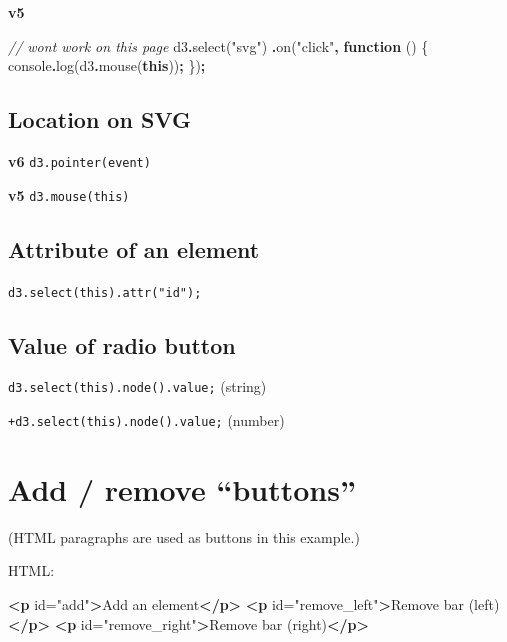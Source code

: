 \documentclass[
  openany]{book}
\newenvironment{Shaded}{\begin{snugshade}}{\end{snugshade}}
\newcommand{\BuiltInTok}[1]{#1}
\newcommand{\CommentTok}[1]{\textcolor[rgb]{0.56,0.35,0.01}{\textit{#1}}}
\newcommand{\FunctionTok}[1]{\textcolor[rgb]{0.00,0.00,0.00}{#1}}
\newcommand{\KeywordTok}[1]{\textcolor[rgb]{0.13,0.29,0.53}{\textbf{#1}}}
\newcommand{\NormalTok}[1]{#1}
\newcommand{\OperatorTok}[1]{\textcolor[rgb]{0.81,0.36,0.00}{\textbf{#1}}}
\newcommand{\OtherTok}[1]{\textcolor[rgb]{0.56,0.35,0.01}{#1}}
\newcommand{\StringTok}[1]{\textcolor[rgb]{0.31,0.60,0.02}{#1}}
\begin{document}
\textbf{v5}

\begin{Shaded}
\begin{Highlighting}[]
\CommentTok{// won\textquotesingle{}t work on this page}
\NormalTok{d3}\OperatorTok{.}\FunctionTok{select}\NormalTok{(}\StringTok{"svg"}\NormalTok{)}
  \OperatorTok{.}\FunctionTok{on}\NormalTok{(}\StringTok{"click"}\OperatorTok{,} \KeywordTok{function}\NormalTok{ () \{}
    \BuiltInTok{console}\OperatorTok{.}\FunctionTok{log}\NormalTok{(d3}\OperatorTok{.}\FunctionTok{mouse}\NormalTok{(}\KeywordTok{this}\NormalTok{))}\OperatorTok{;}
\NormalTok{    \})}\OperatorTok{;}
\end{Highlighting}
\end{Shaded}

\hypertarget{location-on-svg}{%
\subsection{Location on SVG}\label{location-on-svg}}

\textbf{v6}
\texttt{d3.pointer(event)}

\textbf{v5}
\texttt{d3.mouse(this)}

\hypertarget{attribute-of-an-element}{%
\subsection{Attribute of an element}\label{attribute-of-an-element}}

\texttt{d3.select(this).attr("id");}

\hypertarget{value-of-radio-button}{%
\subsection{Value of radio button}\label{value-of-radio-button}}

\texttt{d3.select(this).node().value;} (string)

\texttt{+d3.select(this).node().value;} (number)

\hypertarget{add-remove-buttons}{%
\section{Add / remove ``buttons''}\label{add-remove-buttons}}

(HTML paragraphs are used as buttons in this example.)

HTML:

\begin{Shaded}
\begin{Highlighting}[]
\KeywordTok{\textless{}p}\OtherTok{ id=}\StringTok{"add"}\KeywordTok{\textgreater{}}\NormalTok{Add an element}\KeywordTok{\textless{}/p\textgreater{}}
\KeywordTok{\textless{}p}\OtherTok{ id=}\StringTok{"remove\_left"}\KeywordTok{\textgreater{}}\NormalTok{Remove bar (left)}\KeywordTok{\textless{}/p\textgreater{}}
\KeywordTok{\textless{}p}\OtherTok{ id=}\StringTok{"remove\_right"}\KeywordTok{\textgreater{}}\NormalTok{Remove bar (right)}\KeywordTok{\textless{}/p\textgreater{}}
\end{Highlighting}
\end{Shaded}
\end{document}
